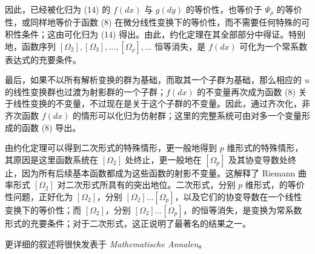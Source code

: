 因此，已经被化归为 (14) 的 \(f(dx)\) 与 \(g(dy)\) 的等价性，也等价于 \(\Psi_\rho\) 的等价性，或同样地等价于函数 (8) 在微分线性变换下的等价性，而不需要任何特殊的可积性条件；这由可化归为 (14) 得出。由此，约化定理在其全部部分中得证。特别地，函数序列
\([\Omega_2],[\Omega_3],\ldots,[\Omega_\rho],\ldots\) 恒等消失，是 \(f(dx)\) 可化为一个常系数表达式的充要条件。

最后，如果不以所有解析变换的群为基础，而取其一个子群为基础，那么相应的 \(u\) 的线性变换群也过渡为射影群的一个子群；\(f(dx)\) 的不变量再次成为函数 (8) 关于线性变换的不变量，不过现在是关于这个子群的不变量。因此，通过齐次化，非齐次函数 \(f(dx)\) 的情形可以化归为仿射群；这里的完整系统可由对多一个变量形成的函数 (8) 导出。

由约化定理可以得到二次形式的特殊情形，更一般地得到 \(p\) 维形式的特殊情形，其原因是这里函数系统在 \([\Omega_2]\) 处终止，更一般地在 \([\Omega_p]\) 及其协变导数处终止，因为所有后续基本函数都成为这些函数的射影不变量。这解释了 Riemann 曲率形式 \([\Omega_2]\) 对二次形式所具有的突出地位。二次形式，分别 \(p\) 维形式，的等价性问题，正好化为 \([\Omega_2]\)，分别 \([\Omega_2]\ldots[\Omega_p]\)，以及它们的协变导数在一个线性变换下的等价性；而 \([\Omega_2]\)，分别 \([\Omega_2]\ldots[\Omega_p]\)，的恒等消失，是变换为常系数形式的充要条件；对于二次形式，这正说明了最著名的结果之一。

更详细的叙述将很快发表于 \emph{Mathematische Annalen}。
